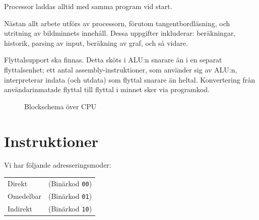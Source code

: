 \documentclass[]{article}
\begin{document}
Processor laddas alltid med samma program vid start. 

Nästan allt arbete utförs av processorn, förutom tangentbordläsning, och utritning av bildminnets innehåll. Dessa uppgifter inkluderar: beräkningar, historik, parsing av input, beräkning av graf, och så vidare.

Flyttalsupport ska finnas. Detta sköts i ALU:n snarare än i en separat flyttalsenhet; ett antal assembly-instruktioner, som använder sig av ALU:n, interpreterar indata (och utdata) som flyttal snarare än heltal. Konvertering från användarinmatade flyttal till flyttal i minnet sker via programkod.
\begin{figure}[h]
	\caption{Blockschema över CPU}
\end{figure}

\newpage

\section{Instruktioner}
Vi har följande adresseringsmoder:

\bigskip
\begin{tabular}{@{\textbullet\hspace*{\labelsep}}ll}
Direkt & (Binärkod \texttt{00}) \\
Omedelbar & (Binärkod \texttt{01}) \\
Indirekt & (Binärkod \texttt{10}) 
\end{tabular}
\bigskip
\end{document}
